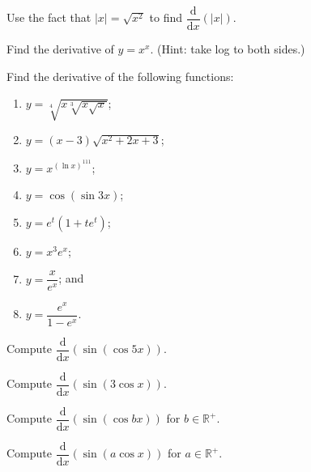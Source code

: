\documentclass[11pt]{article}
\theoremstyle{break}
\newcommand{\differentiate}[1]{\dfrac{\dd}{\dd{#1}}}
\newcommand{\dd}{\text{d}}
\newcommand{\bbR}{\mathbb{R}}
\numberwithin{equation}{theorem}
\begin{document}
\begin{question}
    Use the fact that $|x|=\sqrt{x^2}$ to find $\differentiate{x}\left(|x|\right)$.
\end{question}
\newpage

\begin{question}
    Find the derivative of $y=x^x$. (Hint: take log to both sides.)
\end{question}
\newpage

\begin{question}
    Find the derivative of the following functions:
    \begin{enumerate}
        \item $y=\sqrt[4]{x\sqrt[3]{x\sqrt{x}}}$;
        \item $y=(x-3)\sqrt{x^2+2x+3}$;
        \item $y=x^{\left(\ln x\right)^{111}}$;
        \item $y=\cos(\sin 3x)$;
        \item $y=e^t(1+te^t)$;
        \item $y=x^3e^x$;
        \item $y=\dfrac{x}{e^x}$; and
        \item $y=\dfrac{e^x}{1-e^x}$.
    \end{enumerate}
\end{question}
\newpage

\begin{example}
    Compute $\differentiate{x}\left(\sin\left(\cos 5x\right)\right)$.
\end{example}
\vspace{8em}

\begin{example}
    Compute $\differentiate{x}\left(\sin\left(3\cos x\right)\right)$.
\end{example}
\vspace{8em}

\begin{example}
    Compute $\differentiate{x}\left(\sin\left(\cos bx\right)\right)$ for $b\in\bbR^+$.
\end{example}
\vspace{8em}

\begin{example}
    Compute $\differentiate{x}\left(\sin\left(a\cos x\right)\right)$ for $a\in\bbR^+$.
\end{example}
\vspace{8em}
\end{document}
